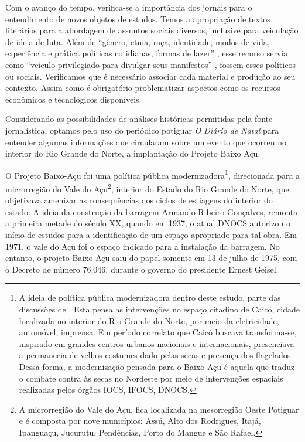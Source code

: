 \begin{refsection}
    Com o avanço do tempo, verifica-se a importância dos jornais para o entendimento de novos objetos de estudos. Temos a apropriação de textos literários para a abordagem de assuntos sociais diversos, inclusive para veiculação de ideia de luta. Além de ``gênero, etnia, raça, identidade, modos de vida, experiência e prática políticas cotidianas, formas de lazer'' \cite[p.~119--120]{Luca2005Historia}, esse recurso servia como ``veículo privilegiado para divulgar seus manifestos'' \cite[p.~125]{Luca2005Historia}, fossem esses políticos ou sociais. Verificamos que é necessário associar cada material e produção ao seu contexto. Assim como é obrigatório problematizar aspectos como os recursos econômicos e tecnológicos disponíveis.  

    Considerando as possibilidades de análises históricas permitidas pela fonte jornalística, optamos pelo uso do periódico potiguar \textit{O Diário de Natal} para entender algumas informações que circularam sobre um evento que ocorreu no interior do Rio Grande do Norte, a implantação do Projeto Baixo Açu.  

    O Projeto Baixo-Açu foi uma política pública modernizadora\footnote{A ideia de política pública modernizadora dentro deste estudo, parte das discussões de \textcite{Andrade2007Caico}. Esta pensa as intervenções no espaço citadino de Caicó, cidade localizada no interior do Rio Grande do Norte, por meio da eletricidade, automóvel, imprensa. Em período correlato que Caicó buscava transforma-se, inspirado em grandes centros urbanos nacionais e internacionais, presenciava a permanecia de velhos costumes dado pelas secas e presença dos flagelados. Dessa forma, a modernização pensada para o Baixo-Açu é aquela que traduz o combate contra às secas no Nordeste por meio de intervenções espaciais realizadas pelos órgãos IOCS, IFOCS, DNOCS.  }, direcionada para a microrregião do Vale do Açu\footnote{A microrregião do Vale do Açu, fica localizada na mesorregião Oeste Potiguar e é composta por nove municípios: Assú, Alto dos Rodrigues, Itajá, Ipanguaçu, Jucurutu, Pendências, Porto do Mangue e São Rafael.}, interior do Estado do Rio Grande do Norte, que objetivava amenizar as consequências dos ciclos de estiagens do interior do estado. A ideia da construção da barragem Armando Ribeiro Gonçalves, remonta a primeira metade do século XX, quando em 1937, o atual DNOCS autorizou o início de estudos para a identificação de um espaço apropriado para tal obra. Em 1971, o vale do Açu foi o espaço indicado para a instalação da barragem. No entanto, o projeto Baixo-Açu saiu do papel somente em 13 de julho de 1975, com o Decreto de número 76.046, durante o governo do presidente Ernest Geisel. 


\end{refsection}
